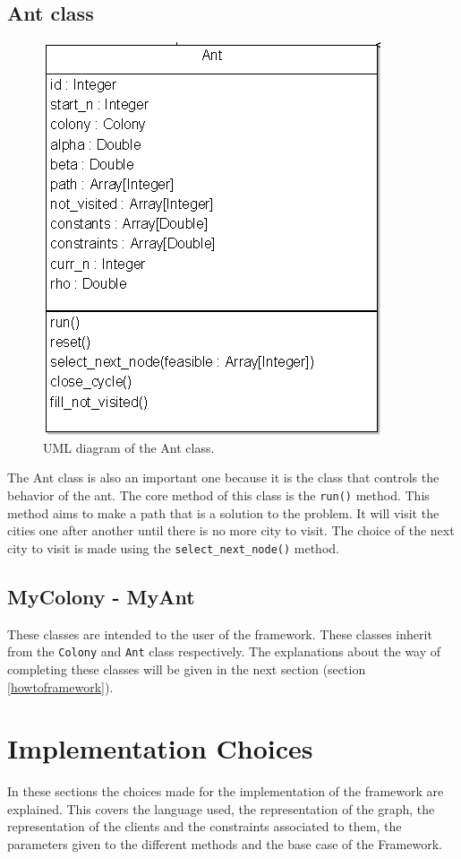 \subsection{Ant class}
\begin{figure}
	\centering
	\includegraphics[scale = 0.5]{images/ant.png}
	\caption{UML diagram of the Ant class.}
	\label{fig:ant}
\end{figure}
The Ant class is also an important one because it is the class that controls the behavior of the ant. The core method of this class is the \texttt{run()} method. This method aims to make a path that is a solution to the problem. It will visit the cities one after another until there is no more city to visit. The choice of the next city to visit is made using the \texttt{select\_next\_node()} method. 

\subsection{MyColony - MyAnt}
These classes are intended to the user of the framework. These classes inherit from the \texttt{Colony} and \texttt{Ant} class respectively. The explanations about the way of completing these classes will be given in the next section (section \ref{howtoframework}).

\section{Implementation Choices}
In these sections the choices made for the implementation of the framework are explained. This covers the language used, the representation of the graph, the representation of the clients and the constraints associated to them, the parameters given to the different methods and the base case of the Framework.

